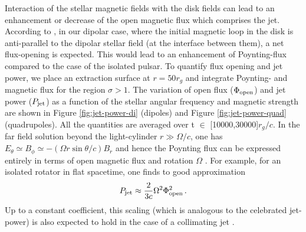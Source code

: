 \documentclass[fleqn,usenatbib]{mnras}
\begin{document}
Interaction of the stellar magnetic fields with the disk fields can lead to an enhancement or decrease of the open magnetic flux which comprises the jet.  According to , in our dipolar case, where the initial magnetic loop in the disk is anti-parallel to the dipolar stellar field (at the interface between them), a net flux-opening is expected.   This would lead to an enhancement of Poynting-flux compared to the case of the isolated pulsar.  To quantify flux opening and jet power, we place an extraction surface at $r=50r_g$ and integrate Poynting- and magnetic flux for the region $\sigma>1$.  
The variation of open flux ($\Phi_{\rm open}$) and jet power ($P_{\rm jet}$) as a function of the stellar angular frequency and magnetic strength are shown in Figure \ref{fig:jet-power-di} (dipoles) and Figure \ref{fig:jet-power-quad} (quadrupoles). All the quantities are averaged over t $\in$ [10000,30000]$r_g/c$. 
In the far field solution beyond the light-cylinder $r\gg \Omega/c$, one has $E_{\theta}\simeq B_\phi\simeq -(\Omega r\sin{\theta}/c)B_r$ \citep[][]{Vlahakis2004} and hence the Poynting flux can be expressed entirely in terms of open magnetic flux and rotation $\Omega$ \citep[e.g.][]{TchekhovskoyPhilippov2015,Parfrey2016}.  For example, for an isolated rotator in flat spacetime, one finds to good approximation 
\begin{align}
    P_{\rm jet} \approx \frac{2}{3c} \Omega^2 \Phi_{\rm open}^2\, .
\end{align}
Up to a constant coefficient, this scaling (which is analogous to the celebrated \cite{BlandfordZnajek1977} jet-power) is also expected to hold in the case of a collimating jet \citep[][]{TchekhovskoyMcKinney2008}.
\end{document}
